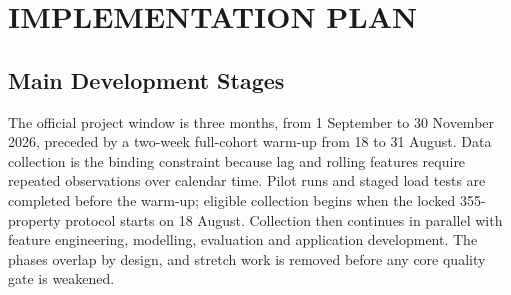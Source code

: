 \chapter{IMPLEMENTATION PLAN}

\section{Main Development Stages}

The official project window is three months, from 1 September to 30 November 2026, preceded by a two-week full-cohort warm-up from 18 to 31 August. Data collection is the binding constraint because lag and rolling features require repeated observations over calendar time. Pilot runs and staged load tests are completed before the warm-up; eligible collection begins when the locked 355-property protocol starts on 18 August. Collection then continues in parallel with feature engineering, modelling, evaluation and application development. The phases overlap by design, and stretch work is removed before any core quality gate is weakened.

